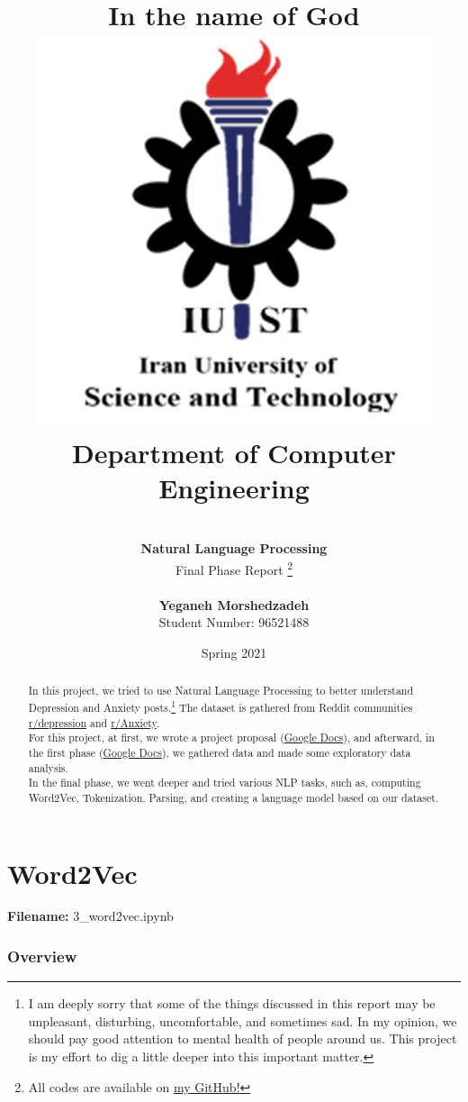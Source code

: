 \documentclass[12pt, a4paper]{article}
\title{
	{\Huge \textbf{In the name of God}}
	\\[20pt]
	\includegraphics[width=0.5\linewidth]{../assets/IUST_logo_color_eng.jpg} \\
	{\normalsize Department of Computer Engineering}
}
\author{
	\\[10pt]
	\textbf{{\LARGE Natural Language Processing}}
	\\[10pt]
	\LARGE Final Phase Report
	\thanks{All codes are available on \href{https://github.com/yegmor/NLPProject}{my GitHub!}}
	
	\\[30pt]
	\textbf{Yeganeh Morshedzadeh}
	\\[5pt]
	Student Number: 96521488
}
\date{Spring 2021}
\begin{document}
	
	\maketitle
	
	\clearpage
	\tableofcontents
	\newpage
	
	\listoffigures
	\newpage
	
	\listoftables
	\newpage
	
	\begin{abstract}
		In this project, we tried to use Natural Language Processing to better understand Depression and Anxiety posts.\footnote{\textcolor{RedViolet}{I am deeply sorry that some of the things discussed in this report may be unpleasant, disturbing, uncomfortable, and sometimes sad. In my opinion, we should pay good attention to mental health of people around us. This project is my effort to dig a little deeper into this important matter.}}
		The dataset is gathered from Reddit communities \href{https://www.reddit.com/r/depression}{r/depression} and \href{https://www.reddit.com/r/Anxiety}{r/Anxiety}.
		\\[10pt]
		
		For this project, at first, we wrote a project proposal (\href{https://docs.google.com/document/d/1tHGEmEgn8-sp8MD72d8NjnZsq-GpVupzsMWgnqaGi-Y/edit?usp=sharing}{Google Docs}), and afterward, in the first phase (\href{https://docs.google.com/document/d/1Jc2ELhweU01Tbf0WalU7wVQABdAV4w50mhQnmMpU2mM/edit?usp=sharing}{Google Docs}), we gathered data and made some exploratory data analysis. 
		\\[10pt]
		
		In the final phase, we went deeper and tried various NLP tasks, such as, computing Word2Vec, Tokenization, Parsing, and creating a language model based on our dataset.\\
		
		
	\end{abstract}
	
	\newpage
	\part{Word2Vec}
	\large{\textbf{Filename:} 3\_word2vec.ipynb}
	\section{Overview}
	
\end{document}
